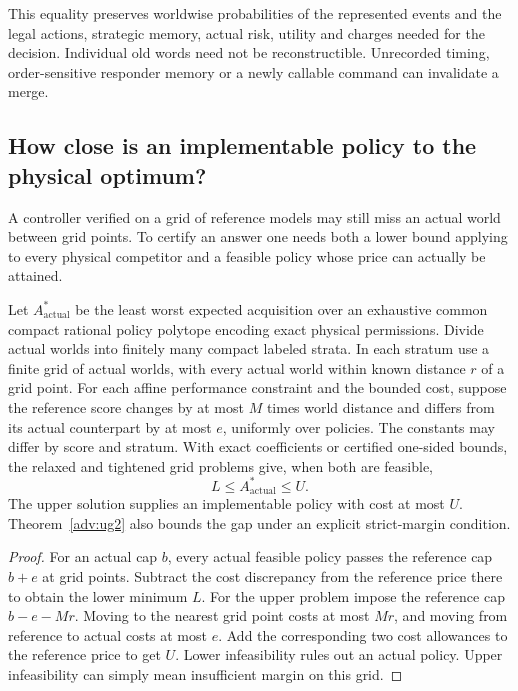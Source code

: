This equality preserves worldwise probabilities of the represented events and the legal actions, strategic memory, actual risk, utility and charges needed for the decision. Individual old words need not be reconstructible. Unrecorded timing, order-sensitive responder memory or a newly callable command can invalidate a merge.

\subsection{How close is an implementable policy to the physical optimum?}\label{body:interval}
A controller verified on a grid of reference models may still miss an actual world between grid points. To certify an answer one needs both a lower bound applying to every physical competitor and a feasible policy whose price can actually be attained.
\begin{theorem}\label{body:certified}
Let \(A^*_{\mathrm{actual}}\) be the least worst expected acquisition over an exhaustive common compact rational policy polytope encoding exact physical permissions. Divide actual worlds into finitely many compact labeled strata. In each stratum use a finite grid of actual worlds, with every actual world within known distance \(r\) of a grid point. For each affine performance constraint and the bounded cost, suppose the reference score changes by at most \(M\) times world distance and differs from its actual counterpart by at most \(e\), uniformly over policies. The constants may differ by score and stratum. With exact coefficients or certified one-sided bounds, the relaxed and tightened grid problems give, when both are feasible,
\[
                     L\le A^*_{\mathrm{actual}}\le U .
\]
The upper solution supplies an implementable policy with cost at most \(U\). Theorem~\ref{adv:ug2} also bounds the gap under an explicit strict-margin condition.
\end{theorem}
\begin{proof}
For an actual cap \(b\), every actual feasible policy passes the reference cap \(b+e\) at grid points. Subtract the cost discrepancy from the reference price there to obtain the lower minimum \(L\). For the upper problem impose the reference cap \(b-e-Mr\). Moving to the nearest grid point costs at most \(Mr\), and moving from reference to actual costs at most \(e\). Add the corresponding two cost allowances to the reference price to get \(U\). Lower infeasibility rules out an actual policy. Upper infeasibility can simply mean insufficient margin on this grid.
\end{proof}

